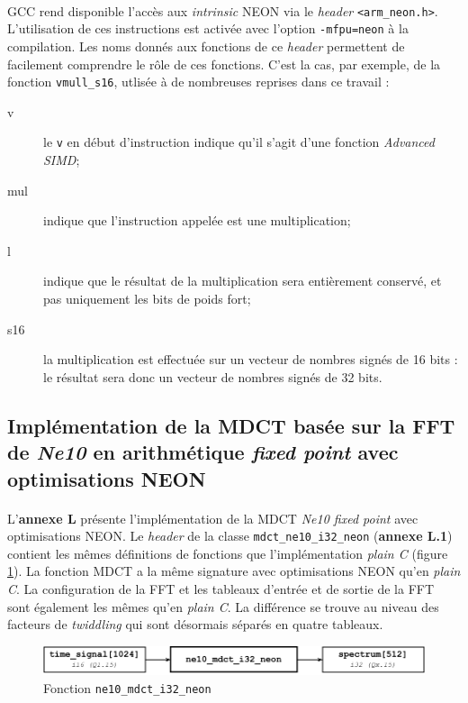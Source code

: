 \documentclass{article}
\begin{document}
    \paragraph{}
    GCC rend disponible l'accès aux \emph{intrinsic} NEON via le \emph{header} \texttt{<arm\_neon.h>}\cite{NEON-list}. L'utilisation de ces instructions est activée avec l'option \texttt{-mfpu=neon} à la compilation. Les noms donnés aux fonctions de ce \emph{header} permettent de facilement comprendre le rôle de ces fonctions. C'est la cas, par exemple, de la fonction \texttt{vmull\_s16}, utlisée à de nombreuses reprises dans ce travail :
    \begin{description}
        \item[v] le \texttt{v} en début d'instruction indique qu'il s'agit d'une fonction \emph{Advanced SIMD};
        \item[mul] indique que l'instruction appelée est une multiplication;
        \item[l] indique que le résultat de la multiplication sera entièrement conservé, et pas uniquement les bits de poids fort;
        \item[s16] la multiplication est effectuée sur un vecteur de nombres signés de 16 bits : le résultat sera donc un vecteur de nombres signés de 32 bits.
    \end{description}


    \subsection{Implémentation de la MDCT basée sur la FFT de \emph{Ne10} en arithmétique \emph{fixed point} avec optimisations NEON}

    \paragraph{}
    L'\textbf{annexe L} présente l'implémentation de la MDCT \emph{Ne10 fixed point} avec optimisations NEON. Le \emph{header} de la classe \texttt{mdct\_ne10\_i32\_neon} (\textbf{annexe L.1}) contient les mêmes définitions de fonctions que l'implémentation \emph{plain C} (figure \ref{fig:func_ne10_mdct_i32_neon}). La fonction MDCT a la même signature avec optimisations NEON qu'en \emph{plain C}. La configuration de la FFT et les tableaux d'entrée et de sortie de la FFT sont également les mêmes qu'en \emph{plain C}. La différence se trouve au niveau des facteurs de \emph{twiddling} qui sont désormais séparés en quatre tableaux.
    \begin{figure}[H]
        \centering
        \includegraphics[width=.8\linewidth]{./images/func_ne10_mdct_i32_neon.pdf}
        \caption{Fonction \texttt{ne10\_mdct\_i32\_neon}}
        \label{fig:func_ne10_mdct_i32_neon}
    \end{figure}
\end{document}
